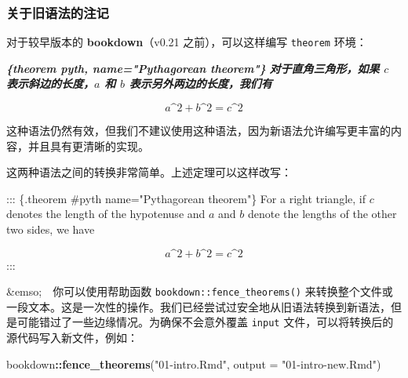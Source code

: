 \documentclass[
  12pt,
]{krantz}
\newenvironment{Shaded}{\begin{snugshade}}{\end{snugshade}}
\newcommand{\AttributeTok}[1]{\textcolor[rgb]{0.13,0.29,0.53}{#1}}
\newcommand{\FunctionTok}[1]{\textcolor[rgb]{0.13,0.29,0.53}{\textbf{#1}}}
\newcommand{\InformationTok}[1]{\textcolor[rgb]{0.56,0.35,0.01}{\textbf{\textit{#1}}}}
\newcommand{\NormalTok}[1]{#1}
\newcommand{\SpecialCharTok}[1]{\textcolor[rgb]{0.81,0.36,0.00}{\textbf{#1}}}
\newcommand{\StringTok}[1]{\textcolor[rgb]{0.31,0.60,0.02}{#1}}
\theoremstyle{definition}
\theoremstyle{definition}
\theoremstyle{definition}
\theoremstyle{definition}
\theoremstyle{remark}
\begin{document}
\subsubsection{关于旧语法的注记}\label{theorem-engine}

对于较早版本的 \textbf{bookdown}（v0.21 之前），可以这样编写 \texttt{theorem} 环境：

\begin{Shaded}
\begin{Highlighting}[]
\InformationTok{\textasciigrave{}\textasciigrave{}\textasciigrave{}\{theorem pyth, name="Pythagorean theorem"\}}
\InformationTok{对于直角三角形，如果 $c$ 表示斜边的长度，$a$ 和 $b$ 表示另外两边的长度，我们有}

\InformationTok{$$a\^{}2 + b\^{}2 = c\^{}2$$}
\InformationTok{\textasciigrave{}\textasciigrave{}\textasciigrave{}}
\end{Highlighting}
\end{Shaded}

这种语法仍然有效，但我们不建议使用这种语法，因为新语法允许编写更丰富的内容，并且具有更清晰的实现。

这两种语法之间的转换非常简单。上述定理可以这样改写：

\begin{Shaded}
\begin{Highlighting}[]
\NormalTok{::: \{.theorem \#pyth name="Pythagorean theorem"\}}
\NormalTok{For a right triangle, if $c$ denotes the length of the hypotenuse}
\NormalTok{and $a$ and $b$ denote the lengths of the other two sides, we have}

\NormalTok{$$a\^{}2 + b\^{}2 = c\^{}2$$}
\NormalTok{:::}
\end{Highlighting}
\end{Shaded}

\&emso; 你可以使用帮助函数 \texttt{bookdown::fence\_theorems()} 来转换整个文件或一段文本。这是一次性的操作。我们已经尝试过安全地从旧语法转换到新语法，但是可能错过了一些边缘情况。为确保不会意外覆盖 \texttt{input} 文件，可以将转换后的源代码写入新文件，例如：

\begin{Shaded}
\begin{Highlighting}[]
\NormalTok{bookdown}\SpecialCharTok{::}\FunctionTok{fence\_theorems}\NormalTok{(}\StringTok{"01{-}intro.Rmd"}\NormalTok{, }\AttributeTok{output =} \StringTok{"01{-}intro{-}new.Rmd"}\NormalTok{)}
\end{Highlighting}
\end{Shaded}
\end{document}

